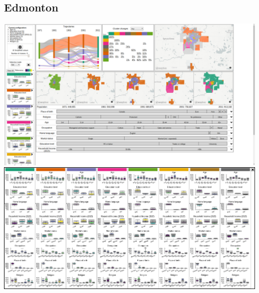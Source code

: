 \documentclass[a4paper]{article}
\begin{document}
\subsection{Edmonton}
\begin{center}
	\includegraphics[width=\linewidth]{2a.png}
	\includegraphics[width=\linewidth]{2b.png}
\end{center}
\end{document}

